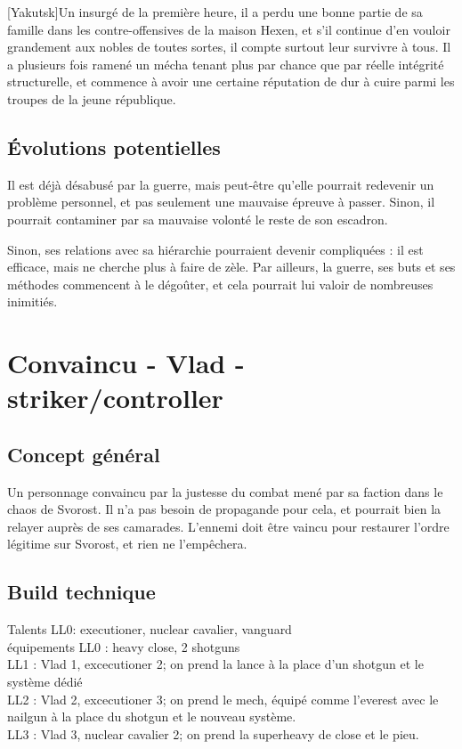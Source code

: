 \documentclass[10pt,a4paper]{article}
\begin{document}
[Yakutsk]Un insurgé de la première heure, il a perdu une bonne partie de sa famille dans les contre-offensives de la maison Hexen, et s'il continue d'en vouloir grandement aux nobles de toutes sortes, il compte surtout leur survivre à tous. Il a plusieurs fois ramené un mécha tenant plus par chance que par réelle intégrité structurelle, et commence à avoir une certaine réputation de dur à cuire parmi les troupes de la jeune république.
\subsection{Évolutions potentielles}
Il est déjà désabusé par la guerre, mais peut-être qu'elle pourrait redevenir un problème personnel, et pas seulement une mauvaise épreuve à passer. Sinon, il pourrait contaminer par sa mauvaise volonté le reste de son escadron.

Sinon, ses relations avec sa hiérarchie pourraient devenir compliquées : il est efficace, mais ne cherche plus à faire de zèle. Par ailleurs, la guerre, ses buts et ses méthodes commencent à le dégoûter, et cela pourrait lui valoir de nombreuses inimitiés.
\section{Convaincu - Vlad - striker/controller}
\subsection{Concept général}
Un personnage convaincu par la justesse du combat mené par sa faction dans le chaos de Svorost. Il n'a pas besoin de propagande pour cela, et pourrait bien la relayer auprès de ses camarades. L'ennemi doit être vaincu pour restaurer l'ordre légitime sur Svorost, et rien ne l'empêchera.
\subsection{Build technique}
Talents LL0: executioner, nuclear cavalier, vanguard\\
équipements LL0 : heavy close, 2 shotguns\\
LL1 : Vlad 1, excecutioner 2; on prend la lance à la place d'un shotgun et le système dédié\\
LL2 : Vlad 2, excecutioner 3; on prend le mech, équipé comme l'everest avec le nailgun à la place du shotgun et le nouveau système.\\
LL3 : Vlad 3, nuclear cavalier 2; on prend la superheavy de close et le pieu.
\end{document}

